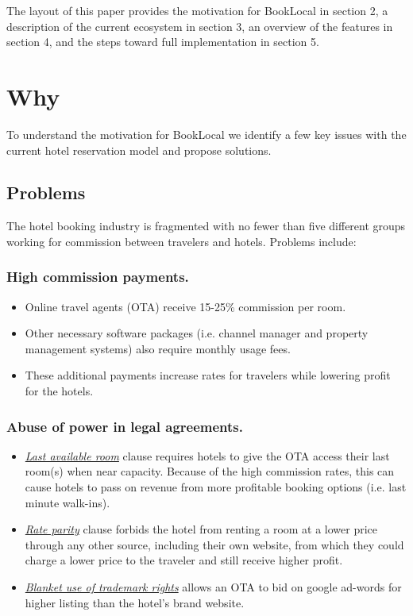 \documentclass{article}
\begin{document}
\begin{flushleft}
The layout of this paper provides the motivation for BookLocal in section 2, a description of the current ecosystem in section 3, an overview of the features in section 4, and the steps toward full implementation in section 5.
\end{flushleft}


\newpage
\section{Why}
To understand the motivation for BookLocal we identify a few key issues with the current hotel reservation model and propose solutions. 

\subsection{Problems}
The hotel booking industry is fragmented with no fewer than five different groups working for commission between travelers and hotels. Problems include:

\subsubsection*{High commission payments.}
  	\begin{itemize}
	 \item Online travel agents (OTA) receive 15-25\% commission per room.
	 \item Other necessary software packages (i.e. channel manager and property management systems) also require monthly usage fees. 
	 \item These additional payments increase rates for travelers while lowering profit for the hotels.
	\end{itemize}
\subsubsection*{Abuse of power in legal agreements.}
    	\begin{itemize}
	 \item \underline{\textit{Last available room}} clause requires hotels to give the OTA access their last room(s) when near capacity. Because of the high commission rates, this can cause hotels to pass on revenue from more profitable booking options (i.e. last minute walk-ins).
	 \item \underline{\textit{Rate parity}} clause forbids the hotel from renting a room at a lower price through any other source, including their own website, from which they could charge a lower price to the traveler and still receive higher profit. 
	 \item \underline{\textit{Blanket use of trademark rights}} allows an OTA to bid on google ad-words for higher listing than the hotel's brand website.
	\end{itemize}
\end{document}
